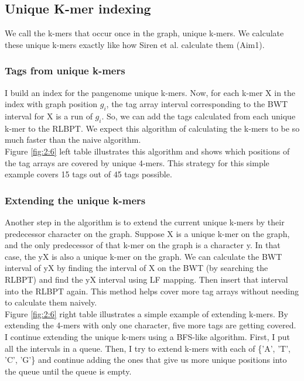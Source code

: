 \documentclass[11pt]{ucthesis}
\begin{document}
\subsection{Unique K-mer indexing}
We call the k-mers that occur once in the graph, unique k-mers. We calculate these unique k-mers exactly like how Siren et al. \cite{siren2023personalized} calculate them (Aim1).
\subsubsection{Tags from unique k-mers}
I build an index for the pangenome unique k-mers. Now, for each k-mer X in the index with graph position $g_i$, the tag array interval corresponding to the BWT interval for X is a run of $g_i$. So, we can add the tags calculated from each unique k-mer to the RLBPT. We expect this algorithm of calculating the k-mers to be so much faster than the naive algorithm. \\
Figure \ref{fig:2:6} left table illustrates this algorithm and shows which positions of the tag arrays are covered by unique 4-mers. This strategy for this simple example covers 15 tags out of 45 tags possible.
\subsubsection{Extending the unique k-mers}
Another step in the algorithm is to extend the current unique k-mers by their predecessor character on the graph. Suppose X is a unique k-mer on the graph, and the only predecessor of that k-mer on the graph is a character y. In that case, the yX is also a unique k-mer on the graph. We can calculate the BWT interval of yX by finding the interval of X on the BWT (by searching the RLBPT) and find the yX interval using LF mapping. Then insert that interval into the RLBPT again. This method helps cover more tag arrays without needing to calculate them naively. \\
Figure \ref{fig:2:6} right table illustrates a simple example of extending k-mers. By extending the 4-mers with only one character, five more tags are getting covered. \\
I continue extending the unique k-mers using a BFS-like algorithm. First, I put all the intervals in a queue. Then, I try to extend k-mers with each of \{'A', 'T', 'C', 'G'\} and continue adding the ones that give us more unique positions into the queue until the queue is empty. 
\end{document}
